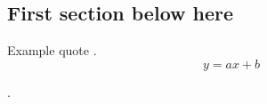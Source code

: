 
\subsection{First section below here}

Example quote \cite{bierlaire_theoretical_2006}. 
\blindtext
\begin{equation}
y = ax + b
\end{equation}

\blindtext.
